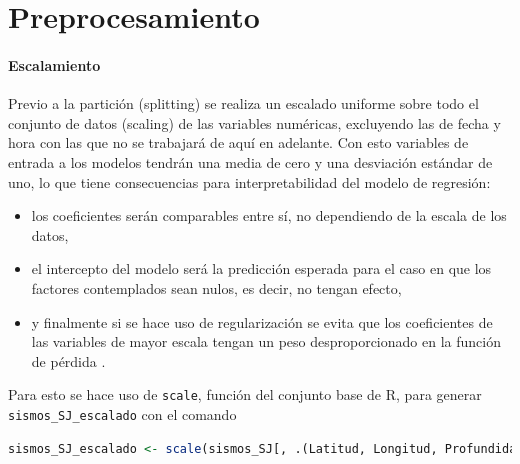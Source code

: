 \documentclass[a4paper]{report}
\begin{document}





\section{Preprocesamiento}





\paragraph{Escalamiento}
Previo a la partición (splitting) se realiza un escalado uniforme sobre todo el conjunto de datos (scaling) de las variables numéricas, excluyendo las de fecha y hora con las que no se trabajará de aquí en adelante.
Con esto variables de entrada a los modelos tendrán una media de cero y una desviación estándar de uno, lo que tiene consecuencias para interpretabilidad del modelo de regresión:
\begin{itemize}
	\item los coeficientes serán comparables entre sí, no dependiendo de la escala de los datos,
	\item el intercepto del modelo será la predicción esperada para el caso en que los factores contemplados sean nulos, es decir, no tengan efecto,
	\item y finalmente si se hace uso de regularización se evita que los coeficientes de las variables de mayor escala tengan un peso desproporcionado en la función de pérdida \cite[sección 3.4.1]{hastie_elements_2009}.
\end{itemize}
Para esto se hace uso de \lstinline[language = R]'scale', función del conjunto base de R, para generar \lstinline[language = R]'sismos_SJ_escalado' con el comando
\begin{lstlisting}[breaklines=true, language=R]
sismos_SJ_escalado <- scale(sismos_SJ[, .(Latitud, Longitud, Profundidad, Magnitud, `Proxy amplitud`, `Proxy energía`)])
\end{lstlisting} 
\end{document}
